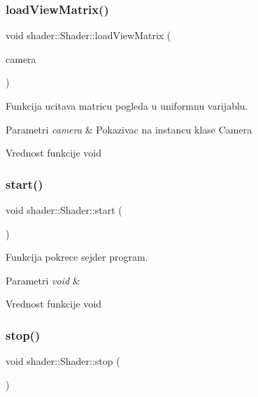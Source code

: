 \subsubsection{\texorpdfstring{load\+View\+Matrix()}{loadViewMatrix()}}
{\footnotesize\ttfamily void shader\+::\+Shader\+::load\+View\+Matrix (\begin{DoxyParamCaption}\item[{\hyperlink{classentity_1_1Camera}{Camera} $\ast$}]{camera }\end{DoxyParamCaption})}



Funkcija ucitava matricu pogleda u uniformnu varijablu. 


\begin{DoxyParams}{Parametri}
{\em camera} & Pokazivac na instancu klase Camera \\
\hline
\end{DoxyParams}
\begin{DoxyReturn}{Vrednost funkcije}
void 
\end{DoxyReturn}
\mbox{\label{classshader_1_1Shader_adb075db73fc6fc5e6bf4d924bc11e6c6}} 
\subsubsection{\texorpdfstring{start()}{start()}}
{\footnotesize\ttfamily void shader\+::\+Shader\+::start (\begin{DoxyParamCaption}\item[{void}]{ }\end{DoxyParamCaption})}



Funkcija pokrece sejder program. 


\begin{DoxyParams}{Parametri}
{\em void} & \\
\hline
\end{DoxyParams}
\begin{DoxyReturn}{Vrednost funkcije}
void 
\end{DoxyReturn}
\mbox{\label{classshader_1_1Shader_a47fa58ad9ede974fe115c73c15c59691}} 
\subsubsection{\texorpdfstring{stop()}{stop()}}
{\footnotesize\ttfamily void shader\+::\+Shader\+::stop (\begin{DoxyParamCaption}\item[{void}]{ }\end{DoxyParamCaption})}



